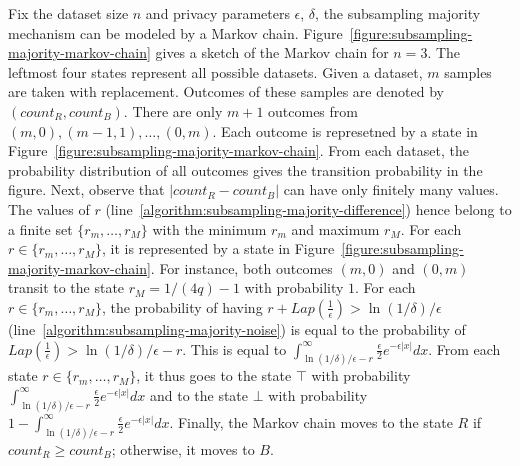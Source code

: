 Fix the dataset size $n$ and privacy parameters $\epsilon$, $\delta$,
the subsampling majority mechanism can be modeled by a Markov chain.
Figure~\ref{figure:subsampling-majority-markov-chain} gives a sketch
of the Markov chain for $n = 3$. The leftmost four states represent
all possible datasets. Given a dataset, $m$ samples are taken with
replacement. Outcomes of these samples are denoted by
$(\mathit{count}_R, \mathit{count}_B)$. There are only $m + 1$
outcomes from $(m, 0), (m - 1, 1), \ldots, (0, m)$. Each outcome is
represetned by a state in
Figure~\ref{figure:subsampling-majority-markov-chain}. From each
dataset, the probability distribution of all outcomes gives the
transition probability in the figure. Next, observe that  $|
\mathit{count}_R - \mathit{count}_B |$ can have only finitely many
values. The values of $r$ 
(line~\ref{algorithm:subsampling-majority-difference}) hence belong to
a finite set $\{ r_m, \ldots, r_M \}$ with the minimum $r_m$ and
maximum $r_M$. For each $r \in \{ r_m, \ldots,
r_M \}$, it is represented by a state in
Figure~\ref{figure:subsampling-majority-markov-chain}. For instance,
both outcomes $(m, 0)$ and $(0, m)$ transit to the state $r_M = 1/(4q)
- 1$ with probability $1$. For each $r \in \{ r_m, \ldots, r_M \}$,
the probability of having $r + \mathit{Lap}(\frac{1}{\epsilon}) > \ln
(1/\delta)/\epsilon$ (line~\ref{algorithm:subsampling-majority-noise})
is equal to the probability of $\mathit{Lap}(\frac{1}{\epsilon}) > \ln
(1/\delta)/\epsilon - r$. This is equal to $\int^{\infty}_{\ln
  (1/\delta)/\epsilon - r} \frac{\epsilon}{2}e^{-\epsilon|x|} dx$.
From each state $r \in \{ r_m, \ldots, r_M \}$, it thus goes to the state
$\top$ with probability $\int^{\infty}_{\ln (1/\delta)/\epsilon - r}
\frac{\epsilon}{2}e^{-\epsilon|x|} dx$ and to the state $\bot$ with
probability $1 - \int^{\infty}_{\ln (1/\delta)/\epsilon - r}
\frac{\epsilon}{2}e^{-\epsilon|x|} dx$. Finally, the Markov chain
moves to the state $R$ if $\mathit{count}_R \geq \mathit{count}_B$;
otherwise, it moves to $B$.


